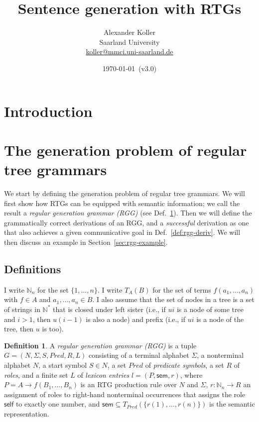 \documentclass[11pt,a4]{article}
\title{Sentence generation with RTGs}
\author{Alexander Koller \\ Saarland University \\
  \url{koller@mmci.uni-saarland.de}}
\date{\today\ (v3.0)}
\def\N{\mathbb{N}}
\newcommand{\sem}{\mathsf{sem}}
\newcommand{\self}{\mathsf{self}}
\theoremstyle{plain}
\theoremstyle{definition}
\newtheorem{definition}[theorem]{Definition}
\begin{document}
\maketitle

\section{Introduction}

\section{The generation problem of regular tree grammars}
\label{sec:gener-probl-regul}

We start by defining the generation problem of regular tree
grammars. We will first show how RTGs can be equipped with semantic
information; we call the result a \emph{regular generation grammar
  (RGG)} (see Def.~\ref{def:rgg}). Then we will define the
grammatically correct derivations of an RGG, and a \emph{successful}
derivation as one that also achieves a given communicative goal in
Def.~\ref{def:rgg-deriv}. We will then discuss an example in
Section~\ref{sec:rgg-example}.


\subsection{Definitions}

I write $\N_n$ for the set $\{1,\ldots,n\}$.  I write $T_A(B)$ for the
set of terms $f(a_1,\ldots,a_n)$ with $f \in A$ and $a_1,\ldots,a_n
\in B$.  I also assume that the set of nodes in a tree is a set of
strings in $\N^*$ that is closed under left sister (i.e., if $ui$ is a
node of some tree and $i>1$, then $u(i-1)$ is also a node) and prefix
(i.e., if $ui$ is a node of the tree, then $u$ is too).

\begin{definition} \label{def:rgg}
  A \emph{regular generation grammar (RGG)} is a tuple $G =
  (N,\Sigma,S,Pred,R,L)$ consisting of a terminal alphabet $\Sigma$, a
  nonterminal alphabet $N$, a start symbol $S \in N$, a set $Pred$ of
  \emph{predicate symbols}, a set $R$ of \emph{roles}, and a finite
  set $L$ of \emph{lexicon entries} $l = (P,\sem,r)$, where $P = A
  \rightarrow f(B_1,\ldots,B_n)$ is an RTG production rule over $N$
  and $\Sigma$, $r:\N_n \rightarrow R$ an assignment of roles to
  right-hand nonterminal occurrences that assigns the role $\self$ to
  exactly one number, and $\sem \subseteq
  T_{Pred}(\{r(1),\ldots,r(n)\})$ is the semantic representation.
\end{definition}
\end{document}

